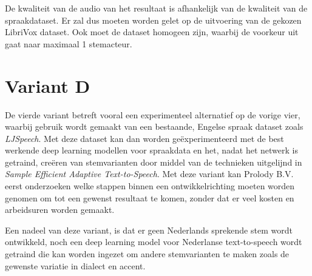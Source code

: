 De kwaliteit van de audio van het resultaat is afhankelijk van de kwaliteit van de spraakdataset. Er zal dus moeten worden gelet op de uitvoering van de gekozen LibriVox dataset. Ook moet de dataset homogeen zijn, waarbij de voorkeur uit gaat naar maximaal 1 stemacteur.

\section{Variant D}
De vierde variant betreft vooral een experimenteel alternatief op de vorige vier, waarbij gebruik wordt gemaakt van een bestaande, Engelse spraak dataset zoals \textit{LJSpeech}. Met deze dataset kan dan worden geëxperimenteerd met de best werkende deep learning modellen voor spraakdata en het, nadat het netwerk is getraind, creëren van stemvarianten door middel van de technieken uitgelijnd in \textit{Sample Efficient Adaptive Text-to-Speech}. Met deze variant kan Prolody B.V. eerst onderzoeken welke stappen binnen een ontwikkelrichting moeten worden genomen om tot een gewenst resultaat te komen, zonder dat er veel kosten en arbeidsuren worden gemaakt.

Een nadeel van deze variant, is dat er geen Nederlands sprekende stem wordt ontwikkeld, noch een deep learning model voor Nederlanse text-to-speech wordt getraind die kan worden ingezet om andere stemvarianten te maken zoals de gewenste variatie in dialect en accent.